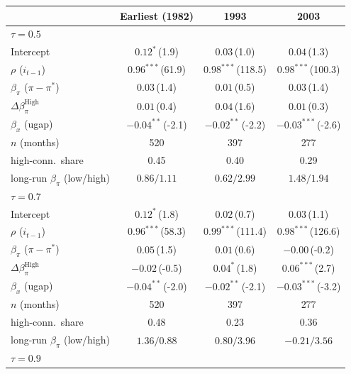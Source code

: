 \setlength{\tabcolsep}{4pt}\scriptsize
\begin{tabular}{lccc}
\toprule
 & Earliest (1982) & 1993 & 2003 \\
\midrule
\multicolumn{4}{l}{\textit{$\tau=0.5$}} \\
Intercept & $0.12^{*}$\,{\scriptsize(1.9)} & $0.03$\,{\scriptsize(1.0)} & $0.04$\,{\scriptsize(1.3)} \\
$\rho$ ($i_{t-1}$) & $0.96^{***}$\,{\scriptsize(61.9)} & $0.98^{***}$\,{\scriptsize(118.5)} & $0.98^{***}$\,{\scriptsize(100.3)} \\
$\beta_\pi$ ($\pi-\pi^*$) & $0.03$\,{\scriptsize(1.4)} & $0.01$\,{\scriptsize(0.5)} & $0.03$\,{\scriptsize(1.4)} \\
$\Delta\beta_\pi^{\text{High}}$ & $0.01$\,{\scriptsize(0.4)} & $0.04$\,{\scriptsize(1.6)} & $0.01$\,{\scriptsize(0.3)} \\
$\beta_x$ (ugap) & $-0.04^{**}$\,{\scriptsize(-2.1)} & $-0.02^{**}$\,{\scriptsize(-2.2)} & $-0.03^{***}$\,{\scriptsize(-2.6)} \\
\addlinespace
$n$ (months) & 520 & 397 & 277 \\
high-conn.\ share & 0.45 & 0.40 & 0.29 \\
long-run $\beta_\pi$ (low/high) & $0.86/1.11$ & $0.62/2.99$ & $1.48/1.94$ \\
\midrule
\multicolumn{4}{l}{\textit{$\tau=0.7$}} \\
Intercept & $0.12^{*}$\,{\scriptsize(1.8)} & $0.02$\,{\scriptsize(0.7)} & $0.03$\,{\scriptsize(1.1)} \\
$\rho$ ($i_{t-1}$) & $0.96^{***}$\,{\scriptsize(58.3)} & $0.99^{***}$\,{\scriptsize(111.4)} & $0.98^{***}$\,{\scriptsize(126.6)} \\
$\beta_\pi$ ($\pi-\pi^*$) & $0.05$\,{\scriptsize(1.5)} & $0.01$\,{\scriptsize(0.6)} & $-0.00$\,{\scriptsize(-0.2)} \\
$\Delta\beta_\pi^{\text{High}}$ & $-0.02$\,{\scriptsize(-0.5)} & $0.04^{*}$\,{\scriptsize(1.8)} & $0.06^{***}$\,{\scriptsize(2.7)} \\
$\beta_x$ (ugap) & $-0.04^{**}$\,{\scriptsize(-2.0)} & $-0.02^{**}$\,{\scriptsize(-2.1)} & $-0.03^{***}$\,{\scriptsize(-3.2)} \\
\addlinespace
$n$ (months) & 520 & 397 & 277 \\
high-conn.\ share & 0.48 & 0.23 & 0.36 \\
long-run $\beta_\pi$ (low/high) & $1.36/0.88$ & $0.80/3.96$ & $-0.21/3.56$ \\
\midrule
\multicolumn{4}{l}{\textit{$\tau=0.9$}} \\

\end{tabular}
